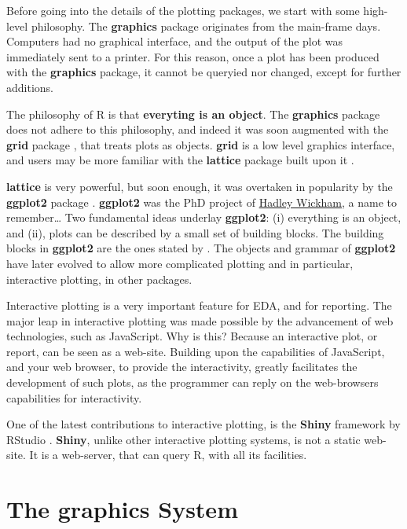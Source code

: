 \documentclass[]{book}
\theoremstyle{definition}
\theoremstyle{definition}
\theoremstyle{remark}
\begin{document}
Before going into the details of the plotting packages, we start with
some high-level philosophy. The \textbf{graphics} package originates
from the main-frame days. Computers had no graphical interface, and the
output of the plot was immediately sent to a printer. For this reason,
once a plot has been produced with the \textbf{graphics} package, it
cannot be queryied nor changed, except for further additions.

The philosophy of R is that \textbf{everyting is an object}. The
\textbf{graphics} package does not adhere to this philosophy, and indeed
it was soon augmented with the \textbf{grid} package \citep{Rlanguage},
that treats plots as objects. \textbf{grid} is a low level graphics
interface, and users may be more familiar with the \textbf{lattice}
package built upon it \citep{lattice}.

\textbf{lattice} is very powerful, but soon enough, it was overtaken in
popularity by the \textbf{ggplot2} package \citep{ggplot2}.
\textbf{ggplot2} was the PhD project of \href{http://hadley.nz/}{Hadley
Wickham}, a name to remember\ldots{} Two fundamental ideas underlay
\textbf{ggplot2}: (i) everything is an object, and (ii), plots can be
described by a small set of building blocks. The building blocks in
\textbf{ggplot2} are the ones stated by \citet{wilkinson2006grammar}.
The objects and grammar of \textbf{ggplot2} have later evolved to allow
more complicated plotting and in particular, interactive plotting, in
other packages.

Interactive plotting is a very important feature for EDA, and for
reporting. The major leap in interactive plotting was made possible by
the advancement of web technologies, such as JavaScript. Why is this?
Because an interactive plot, or report, can be seen as a web-site.
Building upon the capabilities of JavaScript, and your web browser, to
provide the interactivity, greatly facilitates the development of such
plots, as the programmer can reply on the web-browsers capabilities for
interactivity.

One of the latest contributions to interactive plotting, is the
\textbf{Shiny} framework by RStudio \citep{shiny}. \textbf{Shiny},
unlike other interactive plotting systems, is not a static web-site. It
is a web-server, that can query R, with all its facilities.

\section{The graphics System}\label{the-graphics-system}
\end{document}
